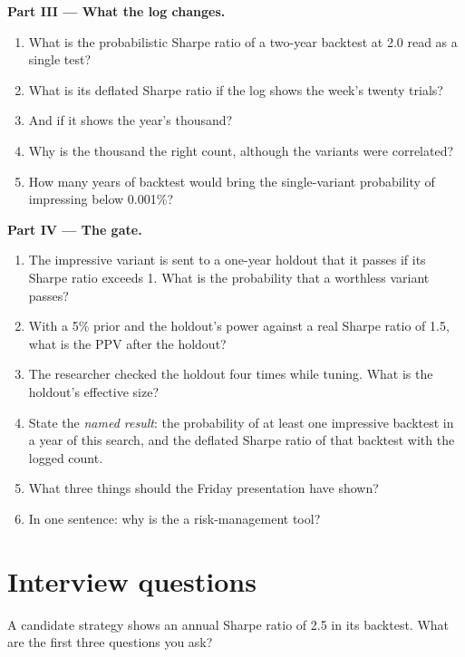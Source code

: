 \begin{problem}
\medskip\noindent\textbf{Part III --- What the log changes.}
\begin{enumerate}[resume]
\item What is the probabilistic Sharpe ratio of a two-year backtest at 2.0 read as a single test?
\item What is its deflated Sharpe ratio if the log shows the week's twenty trials?
\item And if it shows the year's thousand?
\item Why is the thousand the right count, although the variants were correlated?
\item How many years of backtest would bring the single-variant probability of impressing below 0.001\%?
\end{enumerate}

\medskip\noindent\textbf{Part IV --- The gate.}
\begin{enumerate}[resume]
\item The impressive variant is sent to a one-year holdout that it passes if its Sharpe ratio exceeds 1. What is the
probability that a worthless variant passes?
\item With a 5\% prior and the holdout's power against a real Sharpe ratio of 1.5, what is the PPV after the holdout?
\item The researcher checked the holdout four times while tuning. What is the holdout's effective size?
\item State the \emph{named result}: the probability of at least one impressive backtest in a year of this search, and the
deflated Sharpe ratio of that backtest with the logged count.
\item What three things should the Friday presentation have shown?
\item In one sentence: why is the  a risk-management tool?
\end{enumerate}
\end{problem}

\section{Interview questions}

\begin{interviewq}\label{iq:rs:the-research-process:1}
A candidate strategy shows an annual Sharpe ratio of 2.5 in its backtest. What are the first three questions you ask?
\end{interviewq}

